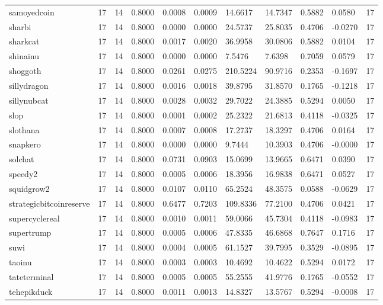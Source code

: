 \begin{table}[htbp]
\begin{tabular}{lllllllllll}
samoyedcoin & 17 & 14 & 0.8000 & 0.0008 & 0.0009 & 14.6617 & 14.7347 & 0.5882 & 0.0580 & 17 \\
sharbi & 17 & 14 & 0.8000 & 0.0000 & 0.0000 & 24.5737 & 25.8035 & 0.4706 & -0.0270 & 17 \\
sharkcat & 17 & 14 & 0.8000 & 0.0017 & 0.0020 & 36.9958 & 30.0806 & 0.5882 & 0.0104 & 17 \\
shinainu & 17 & 14 & 0.8000 & 0.0000 & 0.0000 & 7.5476 & 7.6398 & 0.7059 & 0.0579 & 17 \\
shoggoth & 17 & 14 & 0.8000 & 0.0261 & 0.0275 & 210.5224 & 90.9716 & 0.2353 & -0.1697 & 17 \\
sillydragon & 17 & 14 & 0.8000 & 0.0016 & 0.0018 & 39.8795 & 31.8570 & 0.1765 & -0.1218 & 17 \\
sillynubcat & 17 & 14 & 0.8000 & 0.0028 & 0.0032 & 29.7022 & 24.3885 & 0.5294 & 0.0050 & 17 \\
slop & 17 & 14 & 0.8000 & 0.0001 & 0.0002 & 25.2322 & 21.6813 & 0.4118 & -0.0325 & 17 \\
slothana & 17 & 14 & 0.8000 & 0.0007 & 0.0008 & 17.2737 & 18.3297 & 0.4706 & 0.0164 & 17 \\
snapkero & 17 & 14 & 0.8000 & 0.0000 & 0.0000 & 9.7444 & 10.3903 & 0.4706 & -0.0000 & 17 \\
solchat & 17 & 14 & 0.8000 & 0.0731 & 0.0903 & 15.0699 & 13.9665 & 0.6471 & 0.0390 & 17 \\
speedy2 & 17 & 14 & 0.8000 & 0.0005 & 0.0006 & 18.3956 & 16.9838 & 0.6471 & 0.0527 & 17 \\
squidgrow2 & 17 & 14 & 0.8000 & 0.0107 & 0.0110 & 65.2524 & 48.3575 & 0.0588 & -0.0629 & 17 \\
strategicbitcoinreserve & 17 & 14 & 0.8000 & 0.6477 & 0.7203 & 109.8336 & 77.2100 & 0.4706 & 0.0421 & 17 \\
supercyclereal & 17 & 14 & 0.8000 & 0.0010 & 0.0011 & 59.0066 & 45.7304 & 0.4118 & -0.0983 & 17 \\
supertrump & 17 & 14 & 0.8000 & 0.0005 & 0.0006 & 47.8335 & 46.6868 & 0.7647 & 0.1716 & 17 \\
suwi & 17 & 14 & 0.8000 & 0.0004 & 0.0005 & 61.1527 & 39.7995 & 0.3529 & -0.0895 & 17 \\
taoinu & 17 & 14 & 0.8000 & 0.0003 & 0.0003 & 10.4692 & 10.4622 & 0.5294 & 0.0172 & 17 \\
tateterminal & 17 & 14 & 0.8000 & 0.0005 & 0.0005 & 55.2555 & 41.9776 & 0.1765 & -0.0552 & 17 \\
tehepikduck & 17 & 14 & 0.8000 & 0.0011 & 0.0013 & 14.8327 & 13.5767 & 0.5294 & -0.0008 & 17 \\

\end{tabular}
\end{table}
